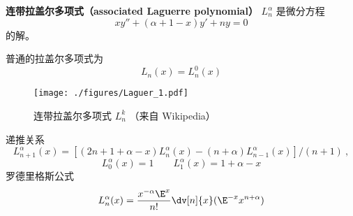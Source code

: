 
\begin{issues}
\issueDraft
\end{issues}

\textbf{连带拉盖尔多项式（associated Laguerre polynomial）} $L_{n}^\alpha$ 是微分方程
\begin{equation}
xy'' + (\alpha + 1 - x) y' + ny = 0
\end{equation}
的解。

普通的拉盖尔多项式为
\begin{equation}
L_n(x) = L_n^0(x)
\end{equation}

\begin{figure}[ht]
\centering
\texttt{[image: ./figures/Laguer\_1.pdf]}
\caption{连带拉盖尔多项式 $L_n^k$ （来自 Wikipedia）} \label{Laguer_fig1}
\end{figure}

递推关系
\begin{equation}
L_{n+1}^\alpha (x) = [(2n + 1 + \alpha  - x)L_n^\alpha (x) - (n + \alpha )L_{n - 1}^\alpha (x)]/(n + 1)~,
\end{equation}
\begin{equation}
L_0^\alpha (x) = 1
\qquad
L_1^\alpha (x) = 1 + \alpha  - x
\end{equation}  
罗德里格斯公式
\begin{equation}
L_n^\alpha (x) = \frac{x^{-\alpha} \E^x}{n!} \dv[n]{x} (\E^{-x} x^{n+\alpha})
\end{equation}
